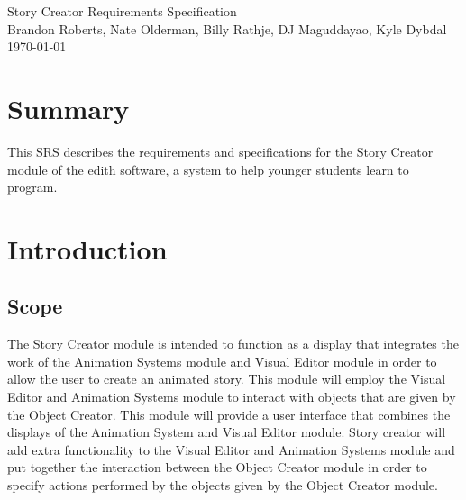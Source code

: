 \documentclass[12pt]{article}
\begin{document}

\begin{titlepage}
	\vspace*{\fill} %
	\begin{center}
		{\Huge Story Creator Requirements Specification}\\ [0.5cm]	%
		{\Large Brandon Roberts, Nate Olderman, Billy Rathje, DJ Maguddayao, Kyle Dybdal}\\[0.4cm]
		\today %
	\end{center}
	\vspace*{\fill}
\end{titlepage}

\section{Summary}
This SRS describes the requirements and specifications for the Story Creator module of the edith software, a system to help younger students learn to program. 



\section{Introduction}%
	\subsection{Scope}
	The Story Creator module is intended to function as a display that integrates the work of the Animation Systems module and Visual Editor module in order to allow the user to create an animated story.  This module will employ the Visual Editor and Animation Systems module to interact with objects that are given by the Object Creator.  This module will provide a user interface that combines the displays of the Animation System and Visual Editor module.  Story creator will add extra functionality to the Visual Editor and Animation Systems module and put together the interaction between the Object Creator module in order to specify actions performed by the objects given by the Object Creator module.\
\end{document}
